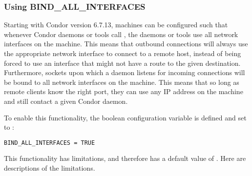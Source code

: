 \subsubsection{\label{sec:Using-BindAllInterfaces}Using 
BIND\_ALL\_INTERFACES}

Starting with Condor version 6.7.13, machines can be configured such that
whenever Condor daemons or tools
call , the daemons or tools use all network interfaces on
the machine.
This means that outbound connections will always use the appropriate
network interface to connect to a remote host,
instead of being forced to use
an interface that might not have a route to the given destination.
Furthermore, sockets upon which a daemon listens for incoming connections 
will be bound to all network interfaces on the machine.
This means that so long as remote clients know the right port, they can
use any IP address on the machine and still contact a given Condor daemon.

To enable this functionality, the boolean configuration
variable
is defined and set to :

\begin{verbatim}
BIND_ALL_INTERFACES = TRUE
\end{verbatim}

This functionality has limitations,
and therefore has a default value of .
Here are descriptions of the limitations.

